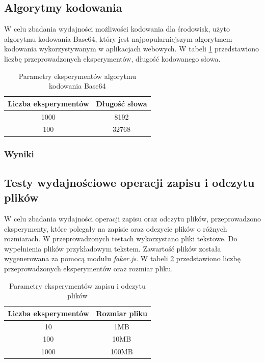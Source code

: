 \subsection{Algorytmy kodowania}
W celu zbadania wydajności możliwości kodowania dla środowisk, użyto algorytmu kodowania Base64, który jest najpopularniejszym algorytmem kodowania wykorzystywanym w aplikacjach webowych. W tabeli \ref{tab:encoding_experiments} przedstawiono liczbę przeprowadzonych eksperymentów, długość kodowanego słowa.

\begin{table}[H]
  \centering
  \caption{Parametry eksperymentów algorytmu kodowania Base64}
  \begin{tabular}{|c|c|}
    \hline
    \textbf{Liczba eksperymentów} & \textbf{Długość słowa}\\ \hline
    1000 & 8192 \\ \hline
    100 & 32768 \\ \hline
  \end{tabular}
  \label{tab:encoding_experiments}
\end{table}

\subsubsection{Wyniki}

\subsection{Testy wydajnościowe operacji zapisu i odczytu plików}
W celu zbadania wydajności operacji zapisu oraz odczytu plików, przeprowadzono eksperymenty, które polegały na zapisie oraz odczycie plików o różnych rozmiarach. W przeprowadzonych testach wykorzystano pliki tekstowe. Do wypełnienia plików przykładowym tekstem. Zawartość plików została wygenerowana za pomocą modułu \textit{faker.js}. W tabeli \ref{tab:file_experiments} przedstawiono liczbę przeprowadzonych eksperymentów oraz rozmiar pliku.

\begin{table}[H]
  \centering
  \caption{Parametry eksperymentów zapisu i odczytu plików}
  \begin{tabular}{|c|c|}
    \hline
    \textbf{Liczba eksperymentów} & \textbf{Rozmiar pliku}\\ \hline
    10 & 1MB \\ \hline
    100 & 10MB \\ \hline
    1000 & 100MB \\ \hline
  \end{tabular}
  \label{tab:file_experiments}
\end{table}

